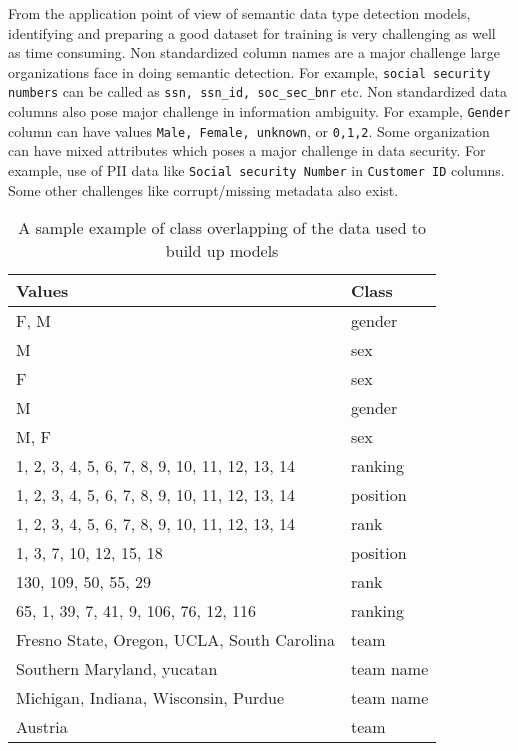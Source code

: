 \documentclass{article}
\begin{document}
 From the application point of view of semantic data type detection models, identifying and preparing a good dataset for training is very challenging as well as time consuming. Non standardized column names are a major challenge large organizations face in doing semantic detection. For example, \texttt{social security numbers} can be called as \texttt{ssn, ssn\_id, soc\_sec\_bnr} etc. Non standardized data columns also pose major challenge in information ambiguity. For example, \texttt{Gender} column can have values \texttt{Male, Female, unknown}, or \texttt{0,1,2}. Some organization can have mixed attributes which poses a major challenge in data security. For example, use of PII data like \texttt{Social security Number} in \texttt{Customer ID} columns. Some other challenges like corrupt/missing metadata also exist. 
\begin{table}
	\centering
	\begin{tabular}{ll}
		\hline
		\textbf{Values} & \textbf{Class} \\
		\hline
		F, M & gender \\
		M & sex \\
		F & sex \\
		M & gender \\
		M, F & sex\\
		\hline
		1, 2, 3, 4, 5, 6, 7, 8, 9, 10, 11, 12, 13, 14 & ranking \\
		1, 2, 3, 4, 5, 6, 7, 8, 9, 10, 11, 12, 13, 14  & position \\
		1, 2, 3, 4, 5, 6, 7, 8, 9, 10, 11, 12, 13, 14 & rank \\
		1, 3, 7, 10, 12, 15, 18 & position \\
		130, 109, 50, 55, 29 & rank \\
		65, 1, 39, 7, 41, 9, 106, 76, 12, 116 & ranking \\
		\hline
		Fresno State, Oregon, UCLA, South Carolina & team \\
		Southern Maryland, yucatan & team name \\
		Michigan, Indiana, Wisconsin, Purdue & team name \\
		Austria & team \\
		\hline
\end{tabular}
	\caption{A sample example of class overlapping of the data used to build up models}
	\label{tab:overlap}
\end{table} 
\end{document}
